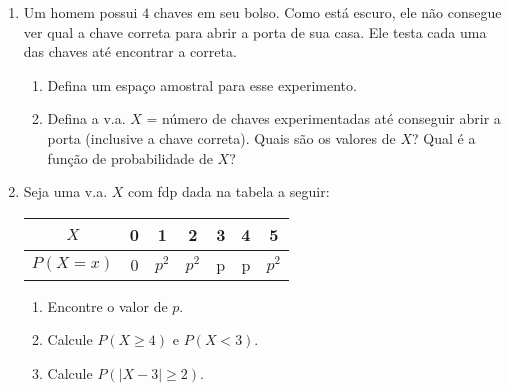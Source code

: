 \begin{enumerate}
\item Um homem possui $4$ chaves em seu bolso. Como está escuro, ele não consegue ver qual a
chave correta para abrir a porta de sua casa. Ele testa cada uma das chaves até encontrar a
correta.

	\begin{enumerate}[label=\alph*)]
		\item Defina um espaço amostral para esse experimento.
		\item Defina a v.a. $X$ = número de chaves experimentadas até conseguir abrir a porta (inclusive a chave correta). 
		Quais são os valores de $X$? Qual é a função de probabilidade de $X$?
	\end{enumerate}
	
\item Seja uma v.a. $X$ com fdp dada na tabela a seguir:

    \begin{table}[htpb]
        \centering
        \begin{tabular}{|c|c|c|c|c|c|c|}
            \hline
            $X$      & 0 & 1       & 2       & 3 & 4 & 5 \\ \hline
            $P(X=x)$ & 0 & $p^{2}$ & $p^{2}$ & p & p & $p^{2}$ \\ \hline
        \end{tabular}
    \end{table}
    
    	\begin{enumerate}[label=\alph*)]
		\item Encontre o valor de $p$.
		\item Calcule $P (X \geq 4)$ e $P (X < 3)$.
		\item Calcule $P (|X − 3| \geq 2)$.
	\end{enumerate}
	\solv{}

\end{enumerate}




